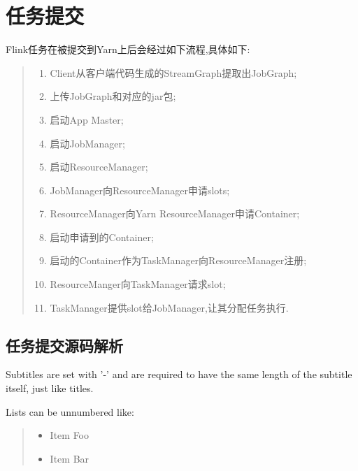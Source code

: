 \documentclass[letterpaper,10pt,english]{sphinxmanual}
\begin{document}
\chapter{任务提交}
\label{\detokenize{jobSubmit:id1}}\label{\detokenize{jobSubmit::doc}}
Flink任务在被提交到Yarn上后会经过如下流程,具体如下:
\begin{quote}

\noindent{}
\begin{enumerate}
%
\item {} 
Client从客户端代码生成的StreamGraph提取出JobGraph;

\item {} 
上传JobGraph和对应的jar包;

\item {} 
启动App Master;

\item {} 
启动JobManager;

\item {} 
启动ResourceManager;

\item {} 
JobManager向ResourceManager申请slots;

\item {} 
ResourceManager向Yarn ResourceManager申请Container;

\item {} 
启动申请到的Container;

\item {} 
启动的Container作为TaskManager向ResourceManager注册;

\item {} 
ResourceManger向TaskManager请求slot;

\item {} 
TaskManager提供slot给JobManager,让其分配任务执行.

\end{enumerate}
\end{quote}


\section{任务提交源码解析}
\label{\detokenize{jobSubmit:id2}}
Subtitles are set with '-' and are required to have the same length
of the subtitle itself, just like titles.

Lists can be unnumbered like:
\begin{quote}
\begin{itemize}
\item {} 
Item Foo

\item {} 
Item Bar

\end{itemize}

\noindent{}
\end{quote}
\end{document}
